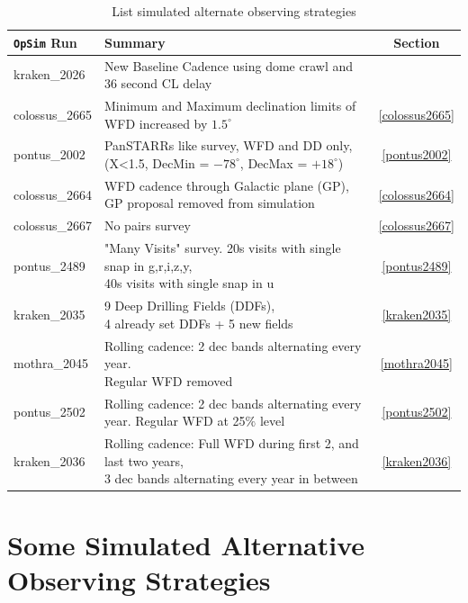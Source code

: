 \documentclass[DM,authoryear,toc]{lsstdoc}
\newcommand{\opsim}{\texttt{OpSim}\xspace}
\begin{document}
\begin{table}[htp]
\caption{List simulated alternate observing strategies}
\begin{center}
\footnotesize
\begin{tabular}{| l | l | c |}
\toprule
\opsim Run & Summary  & Section \\
\midrule
kraken\_2026      & New Baseline Cadence using dome crawl and 36 second CL delay & \\
\midrule
colossus\_2665   & Minimum and Maximum declination limits of WFD increased by $1.5^{\circ}$ & \ref{colossus2665} \\
\midrule
pontus\_2002      & PanSTARRs like survey, WFD and DD only, (X<1.5, DecMin = $-78^{\circ}$, DecMax = $+18^{\circ}$) & \ref{pontus2002}  \\
\midrule
colossus\_2664   & WFD cadence through Galactic plane (GP), GP proposal removed from simulation & \ref{colossus2664} \\
\midrule
colossus\_2667   & No pairs survey &  \ref{colossus2667} \\
\midrule
pontus\_2489      & \makecell{"Many Visits" survey. 20s visits with single snap in g,r,i,z,y, \\ 40s visits with single snap in u}  &  \ref{pontus2489} \\
\midrule
kraken\_2035      &\makecell{ 9 Deep Drilling Fields (DDFs), \\ 4 already set DDFs + 5 new fields} &  \ref{kraken2035} \\
\midrule
mothra\_2045      & \makecell{Rolling cadence: 2 dec bands alternating every year. \\ Regular WFD removed} & \ref {mothra2045} \\
\midrule
pontus\_2502      &  \makecell{Rolling cadence: 2 dec bands alternating every year.  \\ Regular WFD at 25$\%$ level} & \ref {pontus2502} \\
\midrule
kraken\_2036      & \makecell{ Rolling cadence: Full WFD during first 2, and last two years, \\ 3 dec bands alternating every year in between} & \ref {kraken2036} \\
\bottomrule
\end{tabular}
\end{center}
\label{tab:runlist}
\end{table}

\section{Some Simulated Alternative Observing Strategies}
\end{document}
